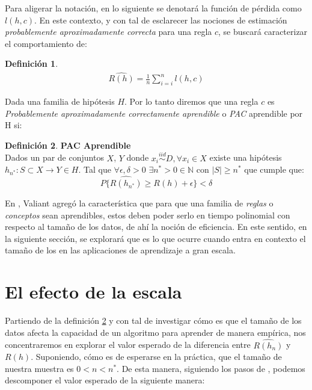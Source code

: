 \documentclass{book}
\theoremstyle{plain}
\theoremstyle{definition}
\newtheorem{defn}{Definición}[section]
\theoremstyle{remark}
\begin{document}
Para aligerar la notación, en lo siguiente se denotará la función de pérdida como $l(h,c)$. En este contexto, y con tal de esclarecer las nociones de estimación \emph{probablemente aproximadamente correcta} para una regla $c$, se buscará caracterizar el comportamiento de:
\begin{defn}\label{eq:def_emp_err_g}
\begin{equation*}
\begin{split}
\hat{R(h)}=\frac{1}{n}\displaystyle\sum_{i=i}^n l(h,c)
\end{split}
\end{equation*}
\end{defn}

Dada una familia de hipótesis $H$. Por lo tanto diremos que una regla $c$ es \emph{Probablemente aproximadamente correctamente aprendible} o \emph{PAC} aprendible por H si:

\begin{defn}\label{eq:pac_aprendible}
\textbf{PAC Aprendible}\\  Dados un par de conjuntos $X$, $Y$ donde $x_i \stackrel{iid}{\sim} D,\forall x_i\in X$ existe una hipótesis $h_{n^{*}}:S\subset X\rightarrow Y\in H$. Tal que $\forall \epsilon,\delta > 0$ $\exists n^{*} > 0 \in \mathbb{N}$ con $|S|\geq n^{*}$ que cumple que:
\begin{equation*}
P\{\hat{R(h_{n^{*}})}\geq R(h) + \epsilon\} < \delta
\end{equation*}
\end{defn}

En \cite{VALIANT}, Valiant agregó la característica que para que una familia de \emph{reglas} o \emph{conceptos} sean aprendibles, estos deben poder serlo en tiempo polinomial con respecto al tamaño de los datos, de ahí la noción de eficiencia. En este sentido, en la siguiente sección, se explorará que es lo que ocurre cuando entra en contexto el tamaño de los en las aplicaciones de aprendizaje a gran escala.

\section{El efecto de la escala}

Partiendo de la definición  \ref{eq:pac_aprendible} y con tal de investigar cómo es que el tamaño de los datos afecta la capacidad de un algoritmo para aprender de manera empírica, nos concentraremos en explorar el valor esperado de la diferencia entre $\hat{R(h_n)}$ y $R(h)$. Suponiendo, cómo es de esperarse en la práctica, que el tamaño de nuestra muestra es $0< n < n^{*}$. De esta manera, siguiendo los pasos de  \cite{BOUSQUET}, podemos descomponer el valor esperado de la siguiente manera:
\end{document}
